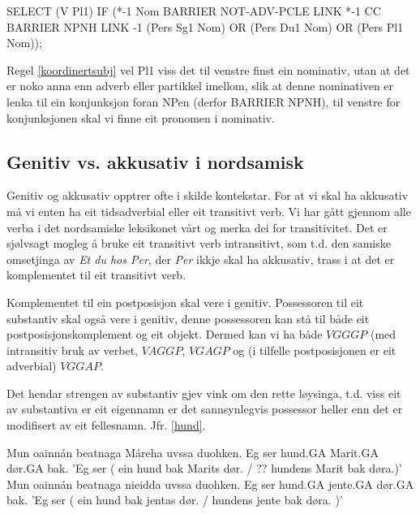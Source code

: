 \documentclass[a4paper,norsk]{article}
\begin{document}
\begin{example}\label{koordinertsubj}
SELECT (V Pl1) IF (*-1 Nom BARRIER NOT-ADV-PCLE LINK *-1 CC BARRIER NPNH
	LINK -1 (Pers Sg1 Nom) OR (Pers Du1 Nom) OR (Pers Pl1 Nom));
\end{example}%

Regel \ref{koordinertsubj} vel Pl1 viss det til venstre finst ein nominativ, utan at det er noko anna enn adverb eller partikkel imellom, slik at denne nominativen er lenka til ein konjunksjon foran NPen (derfor BARRIER NPNH), til venstre for konjunksjonen skal vi finne eit pronomen i nominativ. %





\subsection{Genitiv vs. akkusativ i nordsamisk}

Genitiv og akkusativ opptrer ofte i skilde kontekstar. For at vi skal ha akkusativ må vi enten ha eit tidsadverbial eller eit transitivt verb. Vi har gått gjennom alle verba i det nordsamiske leksikonet vårt og merka dei for transitivitet. Det er sjølvsagt mogleg å bruke eit transitivt  verb intransitivt, som t.d. den samiske omsetjinga av \textit{Et du hos Per}, der \textit{Per} ikkje skal ha akkusativ, trass i at det er komplementet til eit transitivt verb. %

Komplementet til ein postposisjon skal vere i genitiv. Possessoren til eit substantiv skal også vere i genitiv, denne possessoren kan stå til både eit postposisjonskomplement og eit objekt. Dermed kan vi ha både $VGGGP$ (med intransitiv bruk av verbet, $VAGGP$, $VGAGP$ og (i tilfelle postposisjonen er eit adverbial) $VGGAP$. %

Det hendar strengen av substantiv gjev vink om den rette løysinga, t.d. viss eit av substantiva er eit eigennamn er det sannsynlegvis possessor heller enn det er modifisert av eit fellesnamn. Jfr. \ref{hund}. %

\begin{example}\label{hund}
\gll Mun oainnán beatnaga Máreha uvssa duohken.
 Eg ser hund.GA Marit.GA dør.GA bak.
\glt 'Eg ser ( ein hund bak Marits dør. / ?? hundens Marit bak døra.)'
\glend
\gll Mun oainnán beatnaga nieidda uvssa duohken.
  Eg ser hund.GA jente.GA dør.GA bak.
\glt 'Eg ser ( ein hund bak jentas dør. / hundens jente bak døra. )'
\glend
\end{example}
\end{document}
